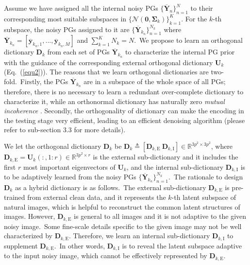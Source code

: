 \documentclass[10pt,twocolumn,letterpaper]{article}
\begin{document}
Assume we have assigned all the internal noisy PGs $\{\mathbf{\overline{Y}}_{n}\}_{n=1}^{N}$ to their corresponding most suitable subspaces in $\{\mathcal{N}(\mathbf{0},\mathbf{\Sigma}_{k})\}_{k=1}^{K}$. For the $k$-th subspace, the noisy PGs assigned to it are $\{\mathbf{\overline{Y}}_{k_{n}}\}_{n=1}^{N_{k}}$ where $\mathbf{\overline{Y}}_{k_{n}}=[\mathbf{\overline{y}}_{k_{n},1},...,\mathbf{\overline{y}}_{k_{n},M}]$ and $\sum_{k=1}^{K}N_{k}=N$.\ We propose to learn an orthogonal dictionary $\mathbf{D}_{k}$ from each set of PGs $\mathbf{\overline{Y}}_{k_{n}}$ to characterize the internal PG prior with the guidance of the corresponding external orthogonal dictionary $\mathbf{U}_{k}$ (Eq.\ (\ref{equ2})). The reasons that we learn orthogonal dictionaries are two-fold.\ Firstly, the PGs $\mathbf{\overline{Y}}_{k_{n}}$ are in a subspace of the whole space of all PGs; therefore, there is no necessary to learn a redundant over-complete dictionary to characterize it, while an orthonormal dictionary has naturally zero \emph{mutual incoherence} \cite{donoho2001uncertainty}. Secondly, the orthogonality of dictionary can make the encoding in the testing stage very efficient, leading to an efficient denoising algorithm (please refer to sub-section 3.3 for more details).

We let the orthogonal dictionary $\mathbf{D}_{k}$ be $\mathbf{D}_{k}\triangleq[\mathbf{D}_{k,\text{E}}\ \mathbf{D}_{k,\text{I}}]\in \mathbb{R}^{3p^2\times 3p^2}$, where $\mathbf{D}_{k,\text{E}}=\mathbf{U}_{k}(:,1:r)\in\mathbb{R}^{3p^2\times r}$ is the external sub-dictionary and it includes the first $r$ most important eigenvectors of $\mathbf{U}_{k}$, and the internal sub-dictionary $\mathbf{D}_{k,\text{I}}$ is to be adaptively learned from the noisy PGs $\{\mathbf{\overline{Y}}_{k_{n}}\}_{n=1}^{N_{k}}$.\ The rationale to design $\mathbf{D}_{k}$ as a hybrid dictionary is as follows.\ The external sub-dictionary $\mathbf{D}_{k,\text{E}}$ is pre-trained from external clean data, and it represents the $k$-th latent subspace of natural images, which is helpful to reconstruct the common latent structures of images. However, $\mathbf{D}_{k,\text{E}}$ is general to all images and it is not adaptive to the given noisy image.\ Some fine-scale details specific to the given image may not be well characterized by $\mathbf{D}_{k,\text{E}}$. Therefore, we learn an internal sub-dictionary $\mathbf{D}_{k,\text{I}}$ to supplement $\mathbf{D}_{k,\text{E}}$.\ In other words, $\mathbf{D}_{k,\text{I}}$ is to reveal the latent subspace adaptive to the input noisy image, which cannot be effectively represented by $\mathbf{D}_{k,\text{E}}$. 
\end{document}
